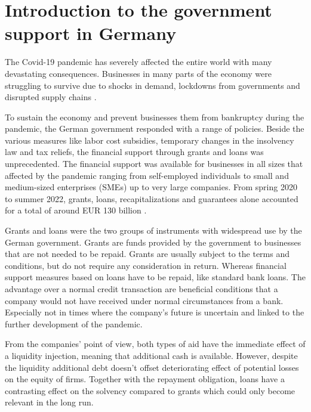 
\chapter{Introduction to the government support in Germany} %

\label{Chapter1} %




The Covid-19 pandemic has severely affected the entire world with many devastating consequences. Businesses in many parts of the economy were struggling to survive due to shocks in demand, lockdowns from governments and disrupted supply chains \parencite{eu_com_temporary_2020}.

To sustain the economy and prevent businesses them from bankruptcy during the pandemic, the German government responded with a range of policies. Beside the various measures like labor cost subsidies, temporary changes in the insolvency law and tax reliefs, the financial support through grants and loans was unprecedented. The financial support was available for businesses in all sizes that affected by the pandemic ranging from self-employed individuals to small and medium-sized enterprises (SMEs) up to very large companies. From spring 2020 to summer 2022, grants, loans, recapitalizations and guarantees alone accounted for a total of around EUR 130 billion \parencite{bmwk_uberblickspapier_2022}. 

Grants and loans were the two groups of instruments with widespread use by the German government. Grants are funds provided by the government to businesses that are not needed to be repaid. Grants are usually subject to the terms and conditions, but do not require any consideration in return. Whereas financial support measures based on loans have to be repaid, like standard bank loans. The advantage over a normal credit transaction are beneficial conditions that a company would not have received under normal circumstances from a bank. Especially not in times where the company's future is uncertain and linked to the further development of the pandemic. 

From the companies' point of view, both types of aid have the immediate effect of a liquidity injection, meaning that additional cash is available. However, despite the liquidity additional debt doesn't offset deteriorating effect of potential losses on the equity of firms. Together with the repayment obligation, loans have a contrasting effect on the solvency compared to grants which could only become relevant in the long run.

